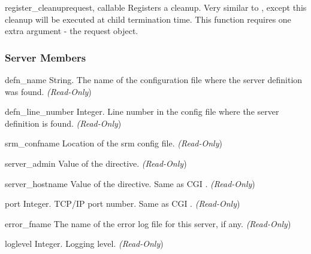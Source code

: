 \begin{methoddesc}[server]{register_cleanup}{request, callable}
Registers a cleanup. Very similar to , except
this cleanup will be executed at child termination time. This function
requires one extra argument - the request object.
\end{methoddesc}

\subsubsection{Server Members\label{pyapi-mpsrv-mem}}

\begin{memberdesc}[server]{defn_name}
String. The name of the configuration file where the server definition
was found.
\emph{(Read-Only})
\end{memberdesc}

\begin{memberdesc}[server]{defn_line_number}
Integer. Line number in the config file where the server definition is
found.
\emph{(Read-Only})
\end{memberdesc}

\begin{memberdesc}[server]{srm_confname}
Location of the srm config file.
\emph{(Read-Only})
\end{memberdesc}

\begin{memberdesc}[server]{server_admin}
Value of the  directive. 
\emph{(Read-Only})
\end{memberdesc}

\begin{memberdesc}[server]{server_hostname}
Value of the  directive. Same as CGI .
\emph{(Read-Only})
\end{memberdesc}

\begin{memberdesc}[server]{port}
Integer. TCP/IP port number. Same as CGI .
\emph{(Read-Only})
\end{memberdesc}

\begin{memberdesc}[server]{error_fname}
The name of the error log file for this server, if any.
\emph{(Read-Only})
\end{memberdesc}

\begin{memberdesc}[server]{loglevel}
Integer. Logging level.
\emph{(Read-Only})
\end{memberdesc}

